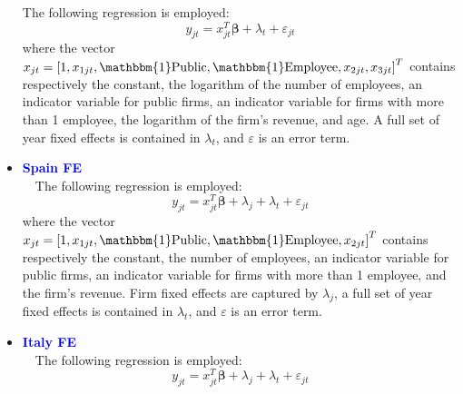 \documentclass[12pt,notitlepage]{article}
\newcommand{\sym}[1] {\ifmmode^{#1} \else\(^{#1}\) \fi}
\begin{document}
\begin{itemize}
The following regression is employed:
	\begin{equation}
	y_{jt} = x^{T}_{jt}\mathbf{\beta} + \lambda_{t} + \varepsilon_{jt}
	\end{equation}
where the vector $x_{jt} = \left[  1, x_{1jt}, \mathbbm{1}\text{Public}, \mathbbm{1}\text{Employee}, x_{2jt}, x_{3jt}  \right]^{T} $ contains respectively the constant, the logarithm of the number of employees, an indicator variable for public firms, an indicator variable for firms with more than 1 employee, the logarithm of the firm's revenue, and age. A full set of year fixed effects is contained in $\lambda_{t}$, and $\varepsilon$ is an error term.
\begin{table}[htbp]\centering
\def\sym#1{\ifmmode^{#1}\else\(^{#1}\)\fi}
\caption{Haltiwanger growth rate}
\end{table}
\clearpage
\item \textcolor{blue}{\textbf{Spain FE}}\\~\
The following regression is employed:
	\begin{equation}
	y_{jt} = x^{T}_{jt}\mathbf{\beta} + \lambda_{j}  + \lambda_{t} + \varepsilon_{jt}
	\end{equation}
where the vector $x_{jt} = \left[  1, x_{1jt}, \mathbbm{1}\text{Public}, \mathbbm{1}\text{Employee}, x_{2jt} \right]^{T} $ contains respectively the constant, the number of employees, an indicator variable for public firms, an indicator variable for firms with more than 1 employee, and the firm's revenue. Firm fixed effects are captured by $\lambda_{j}$, a full set of year fixed effects is contained in $\lambda_{t}$, and $\varepsilon$ is an error term.
\begin{table}[htbp]\centering
\def\sym#1{\ifmmode^{#1}\else\(^{#1}\)\fi}
\caption{Haltiwanger growth rate}
\end{table}
\clearpage
\item \textcolor{blue}{\textbf{Italy FE}}\\~\
The following regression is employed:
	\begin{equation}
	y_{jt} = x^{T}_{jt}\mathbf{\beta} + \lambda_{j}  + \lambda_{t} + \varepsilon_{jt}

\end{equation}
\end{itemize}
\end{document}
